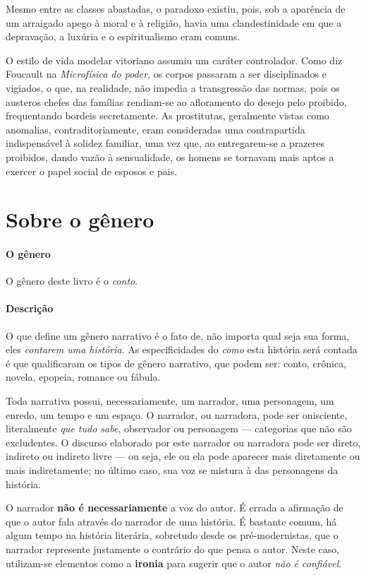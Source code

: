 \documentclass[11pt]{extarticle}
\begin{document}
Mesmo entre as classes abastadas, o paradoxo existiu, pois, sob a aparência de um arraigado
apego à moral e à religião, havia uma clandestinidade em que a depravação, a luxúria
e o espiritualismo eram comuns.

O estilo de vida modelar vitoriano assumiu um caráter controlador.
Como diz Foucault na \textit{Microfísica do poder}, os corpos passaram a ser disciplinados e vigiados, 
o que, na realidade, não impedia a transgressão das normas, pois os
austeros chefes das famílias rendiam-se ao afloramento do desejo pelo proibido, frequentando
bordeis secretamente. As prostitutas, geralmente vistas como anomalias, contraditoriamente,
eram consideradas uma contrapartida indispensável à solidez familiar, uma vez que, ao
entregarem-se a prazeres proibidos, dando vazão à sensualidade, os homens se tornavam mais
aptos a exercer o papel social de esposos e pais. 

\section{Sobre o gênero}

\paragraph{O gênero} O gênero deste livro é o \textit{conto}. 

\paragraph{Descrição} O que define um gênero narrativo é o fato de, não importa
qual seja sua forma, eles \textit{contarem uma história}.
As especificidades do \textit{como} esta história será contada é que
qualificaram os tipos de gênero narrativo, que podem ser: conto, crônica, novela,
epopeia, romance ou fábula. 

Toda narrativa possui, necessariamente, um narrador, uma personagem, um enredo,
um tempo e um espaço. O narrador, ou narradora, pode ser onisciente, literalmente
\textit{que tudo sabe}, observador ou personagem --- categorias que não são excludentes.
O discurso elaborado por este narrador ou narradora pode ser direto, indireto ou indireto livre 
--- ou seja, ele ou ela pode aparecer mais diretamente ou mais indiretamente; no último caso,
sua voz se mistura à das personagens da história.

O narrador \textbf{não é necessariamente} a voz do autor. É errada a afirmação
de que o autor fala através do narrador de uma história. É bastante comum,
há algum tempo na história literária, sobretudo desde os pré-modernistas, que 
o narrador represente justamente o contrário do que pensa o autor. Neste caso, 
utilizam-se elementos como a \textbf{ironia} para sugerir que o autor \textit{não é confiável}.
\end{document}
